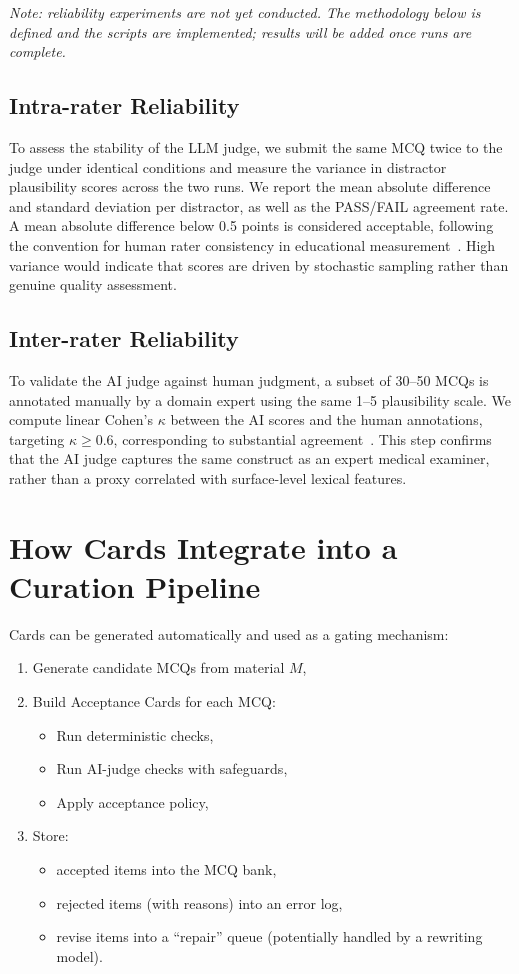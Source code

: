 \documentclass[11pt]{article}
\begin{document}
\textit{Note: reliability experiments are not yet conducted. The methodology below is defined and the scripts are implemented; results will be added once runs are complete.}

\subsection{Intra-rater Reliability}
To assess the stability of the LLM judge, we submit the same MCQ twice to the judge under identical conditions and measure the variance in distractor plausibility scores across the two runs. We report the mean absolute difference and standard deviation per distractor, as well as the PASS/FAIL agreement rate. A mean absolute difference below 0.5 points is considered acceptable, following the convention for human rater consistency in educational measurement~\cite{stemler2004comparison}. High variance would indicate that scores are driven by stochastic sampling rather than genuine quality assessment.

\subsection{Inter-rater Reliability}
To validate the AI judge against human judgment, a subset of 30--50 MCQs is annotated manually by a domain expert using the same 1--5 plausibility scale. We compute linear Cohen's $\kappa$ between the AI scores and the human annotations, targeting $\kappa \geq 0.6$, corresponding to substantial agreement~\cite{landis1977measurement}. This step confirms that the AI judge captures the same construct as an expert medical examiner, rather than a proxy correlated with surface-level lexical features.

\section{How Cards Integrate into a Curation Pipeline}
Cards can be generated automatically and used as a gating mechanism:
\begin{enumerate}[leftmargin=*]
  \item Generate candidate MCQs from material $M$,
  \item Build Acceptance Cards for each MCQ:
  \begin{itemize}[leftmargin=*]
    \item Run deterministic checks,
    \item Run AI-judge checks with safeguards,
    \item Apply acceptance policy,
  \end{itemize}
  \item Store:
  \begin{itemize}[leftmargin=*]
    \item accepted items into the MCQ bank,
    \item rejected items (with reasons) into an error log,
    \item revise items into a ``repair'' queue (potentially handled by a rewriting model).
  \end{itemize}
\end{enumerate}
\end{document}
